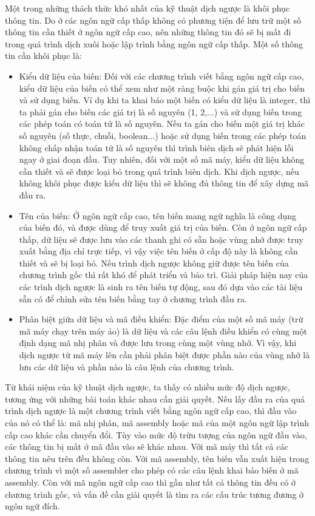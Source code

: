 Một trong những thách thức khó nhất của kỹ thuật dịch ngược là khôi phục thông tin. Do ở các ngôn ngữ cấp thấp không có phương tiện để lưu trữ một số thông tin cần thiết ở ngôn ngữ cấp cao, nên những thông tin đó sẽ bị mất đi trong quá trình dịch xuôi hoặc lập trình bằng ngôn ngữ cấp thấp. Một số thông tin cần khôi phục là:
\begin{itemize}
	\item Kiểu dữ liệu của biến: Đối với các chương trình viết bằng ngôn ngữ cấp cao, kiểu dữ liệu của biến có thể xem như một ràng buộc khi gán giá trị cho biến và sử dụng biến. Ví dụ khi ta khai báo một biến có kiểu dữ liệu là integer, thì ta phải gán cho biến các giá trị là số nguyên (1, 2,...) và sử dụng biến trong các phép toán có toán tử là số nguyên. Nếu ta gán cho biến một giá trị khác số nguyên (số thực, chuỗi, boolean...) hoặc sử dụng biến trong các phép toán không chấp nhận toán tử là số nguyên thì trình biên dịch sẽ phát hiện lỗi ngay ở giai đoạn đầu. Tuy nhiên, đối với một số mã máy, kiểu dữ liệu không cần thiết và sẽ được loại bỏ trong quá trình biên dịch. Khi dịch ngược, nếu không khôi phục được kiểu dữ liệu thì sẽ không đủ thông tin để xây dựng mã đầu ra.
	
	\item Tên của biến: Ở ngôn ngữ cấp cao, tên biến mang ngữ nghĩa là công dụng của biến đó, và được dùng để truy xuất giá trị của biến. Còn ở ngôn ngữ cấp thấp, dữ liệu sẽ được lưu vào các thanh ghi có sẵn hoặc vùng nhớ được truy xuất bằng địa chỉ trực tiếp, vì vậy việc tên biến ở cấp độ này là không cần thiết và sẽ bị loại bỏ. Nếu trình dịch ngược không giữ được tên biến của chương trình gốc thì rất khó để phát triển và bảo trì. Giải pháp hiện nay của các trình dịch ngược là sinh ra tên biến tự động, sau đó dựa vào các tài liệu sẵn có để chỉnh sửa tên biến bằng tay ở chương trình đầu ra.
	
	\item Phân biệt giữa dữ liệu và mã điều khiển: Đặc điểm của một số mã máy (trừ mã	máy chạy trên máy ảo) là dữ liệu và các câu lệnh điều khiển có cùng một định dạng mã nhị phân và được lưu trong cùng một vùng nhớ. Vì vậy, khi dịch ngược từ mã máy lên cần phải phân biệt được phần nào của vùng nhớ là lưu các dữ liệu và phần nào là câu lệnh của chương trình.
\end{itemize}

Từ khái niệm của kỹ thuật dịch ngược, ta thấy có nhiều mức độ dịch ngược, tương ứng với những bài toán khác nhau cần giải quyết. Nếu lấy đầu ra của quá trình dịch ngược là một chương trình viết bằng ngôn ngữ cấp cao, thì đầu vào của nó có thể là: mã nhị phân, mã assembly hoặc mã của một ngôn ngữ lập trình cấp cao khác cần chuyển đổi. Tùy vào mức độ trừu tượng của ngôn ngữ đầu vào, các thông tin bị mất ở mã đầu vào sẽ khác nhau. Với mã máy thì tất cả các thông tin nêu trên đều không còn. Với mã assembly, tên biến vẫn xuất hiện trong chương trình vì một số assembler cho phép có các câu lệnh khai báo biến ở mã assembly. Còn với mã ngôn ngữ cấp cao thì gần như tất cả thông tin đều có ở chương trình gốc, và vấn đề cần giải quyết là tìm ra các cấu trúc tương đương ở ngôn ngữ đích.


